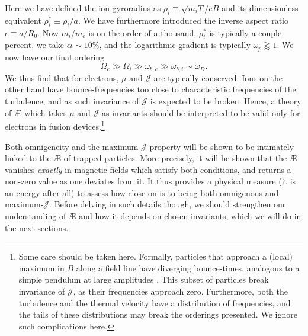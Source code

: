 Here we have defined the ion gyroradius as $\rho_i \equiv \sqrt{m_i T}/eB$ and its dimensionless equivalent $\rho_i^*\equiv \rho_i/a$. We have furthermore introduced the inverse aspect ratio $\epsilon \equiv a/R_0$. Now $m_i/m_e$ is on the order of a thousand, $\rho_i^*$ is typically a couple percent, we take $\epsilon \iota \sim 10 \%$, and the logarithmic gradient is typically $\omega_p \gtrapprox 1$. We now have our final ordering
\begin{equation}
    \Omega_e  \gg \Omega_i \gg \omega_{b,e} \gg \omega_{b,i} \sim \omega_{D}.
\end{equation}
We thus find that for electrons, $\mu$ and $\mathcal{J}$ are typically conserved. Ions on the other hand have bounce-frequencies too close to characteristic frequencies of the turbulence, and as such invariance of $\mathcal{J}$ is expected to be broken. Hence, a theory of \AE{} which takes $\mu$ and $\mathcal{J}$ as invariants should be interpreted to be valid only for electrons in fusion devices.\footnote{Some care should be taken here. Formally, particles that approach a (local) maximum in $B$ along a field line have diverging bounce-times, analogous to a simple pendulum at large amplitudes \cite{lewowski2002period}. This subset of particles break invariance of $\mathcal{J}$, as their frequencies approach zero. Furthermore, both the turbulence and the thermal velocity have a distribution of frequencies, and the tails of these distributions may break the orderings presented. We ignore such complications here.} \par
Both omnigeneity and the maximum-$\mathcal{J}$ property will be shown to be intimately linked to the \AE{} of trapped particles. More precisely, it will be shown that the \AE{} vanishes \textit{exactly} in magnetic fields which satisfy both conditions, and returns a non-zero value as one deviates from it. It thus provides a physical measure (it is an energy after all) to assess how close on is to being both omnigenous and maximum-$\mathcal{J}$. Before delving in such details though, we should strengthen our understanding of \AE{} and how it depends on chosen invariants, which we will do in the next sections.



